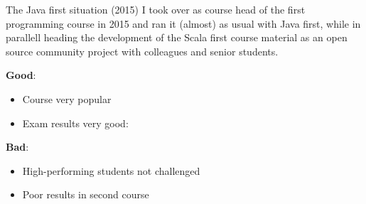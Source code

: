 \documentclass[aspectratio=169]{beamer}
\newenvironment{Slide}[1]%
  {\begin{frame}[environment=Slide]{#1}}
  {\end{frame}}%
\begin{document}
\begin{Slide}{The Java first situation (2015)}
  I took over as course head of the first programming course in 2015 and ran it (almost) as usual with Java first, while in parallell heading the development of the Scala first course material as an open source community project with colleagues and senior students.

  \vspace{0.5em}%
  \begin{minipage}[t]{0.42\textwidth}
      \textbf{Good}:
      \begin{itemize}
        \item Course very popular
        \item Exam results very good:  
      
      \end{itemize}
    \end{minipage}%
    \begin{minipage}[t]{0.6\textwidth}
      \textbf{Bad}:
      \begin{itemize}
        \item High-performing students not challenged
        \item Poor results in second course
      \end{itemize}   
    \end{minipage}
\end{Slide}
\end{document}

